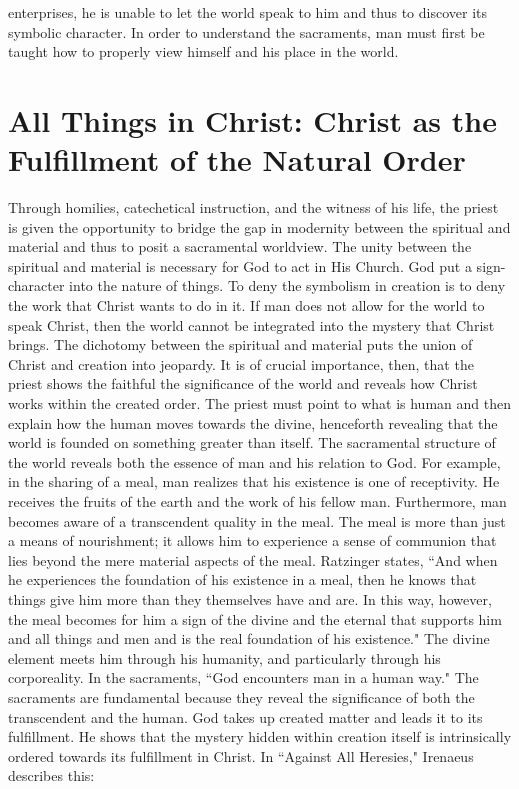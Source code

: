 \documentclass[twoside,10pt]{article}
\begin{document}
enterprises, he is unable to let the world speak to him and thus to discover its symbolic character. In order to understand the sacraments, man must first be taught how to properly view himself and his place in the world. 



\section{All Things in Christ: Christ as the Fulfillment of the Natural Order}

Through homilies, catechetical instruction, and the witness of his life, the priest is given the opportunity to bridge the gap in modernity between the spiritual and material and thus to posit a sacramental worldview. The unity between the spiritual and material is necessary for God to act in His Church. God put a sign-character into the nature of things. To deny the symbolism in creation is to deny the work that Christ wants to do in it. If man does not allow for the world to speak Christ, then the world cannot be integrated into the mystery that Christ brings. The dichotomy between the spiritual and material puts the union of Christ and creation into jeopardy. It is of crucial importance, then, that the priest shows the faithful the significance of the world and reveals how Christ works within the created order. The priest must point to what is human and then explain how the human moves towards the divine, henceforth revealing that the world is founded on something greater than itself. The sacramental structure of the world reveals both the essence of man and his relation to God. For example, in the sharing of a meal, man realizes that his existence is one of receptivity. He receives the fruits of the earth and the work of his fellow man. Furthermore, man becomes aware of a transcendent quality in the meal. The meal is more than just a means of nourishment; it allows him to experience a sense of communion that lies beyond the mere material aspects of the meal. Ratzinger states, ``And when he experiences the foundation of his existence in a meal, then he knows that things give him more than they themselves have and are. In this way, however, the meal becomes for him a sign of the divine and the eternal that supports him and all things and men and is the real foundation of his existence."\autocite[158]{rat2} The divine element meets him through his humanity, and particularly through his corporeality. In the sacraments, ``God encounters man in a human way."\autocite[158]{rat2} The sacraments are fundamental because they reveal the significance of both the transcendent and the human. God takes up created matter and leads it to its fulfillment. He shows that the mystery hidden within creation itself is intrinsically ordered towards its fulfillment in Christ. In ``Against All Heresies," Irenaeus describes this: 
\end{document}
